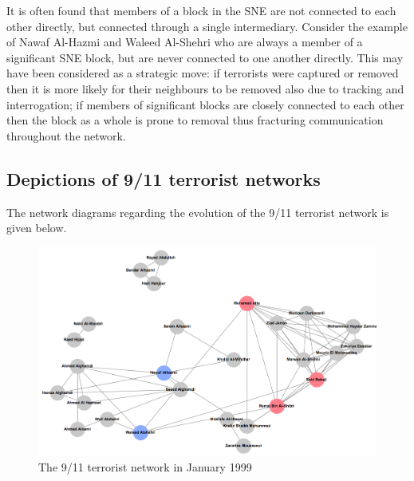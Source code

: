 It is often found that members of a block in the SNE are not connected to each other directly, but connected through a single intermediary. Consider the example of Nawaf Al-Hazmi and Waleed Al-Shehri who are always a member of a significant SNE block, but are never connected to one another directly. This may have been considered as a strategic move: if terrorists were captured or removed then it is more likely for their neighbours to be removed also due to tracking and interrogation; if members of significant blocks are closely connected to each other then the block as a whole is prone to removal thus fracturing communication throughout the network.

\begin{subappendices}

\section{Depictions of 9/11 terrorist networks}

The network diagrams regarding the evolution of the 9/11 terrorist network is given below.

\begin{figure}[h]
\begin{center}
\includegraphics[scale=0.4]{imgs/T1999-01.png}
\end{center}
\caption{The 9/11 terrorist network in January 1999}
\label{Terrorist-Jan99}
\end{figure}


\end{subappendices}
